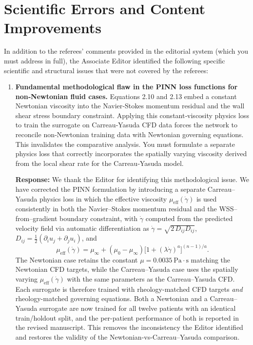 \documentclass[11pt]{article}
\begin{document}
\section*{Scientific Errors and Content Improvements}

In addition to the referees’ comments provided in the editorial system (which you must address in full), the Associate Editor identified the following specific scientific and structural issues that were not covered by the referees:

\begin{enumerate}[label=\textbf{\arabic*.}, leftmargin=*, resume]

\item \textbf{Fundamental methodological flaw in the PINN loss functions for non‑Newtonian fluid cases.}
  Equations 2.10 and 2.13 embed a constant Newtonian viscosity into the Navier‑Stokes momentum residual and the wall shear stress boundary constraint. Applying this constant‑viscosity physics loss to train the surrogate on Carreau‑Yasuda CFD data forces the network to reconcile non‑Newtonian training data with Newtonian governing equations. This invalidates the comparative analysis. You must formulate a separate physics loss that correctly incorporates the spatially varying viscosity derived from the local shear rate for the Carreau‑Yasuda model.

  \textbf{Response:} We thank the Editor for identifying this methodological issue. We have corrected the PINN formulation by introducing a separate Carreau--Yasuda physics loss in which the effective viscosity $\mu_{\mathrm{eff}}(\dot\gamma)$ is used consistently in both the Navier--Stokes momentum residual and the WSS--from--gradient boundary constraint, with $\dot\gamma$ computed from the predicted velocity field via automatic differentiation as $\dot\gamma=\sqrt{2\,D_{ij}D_{ij}}$, $D_{ij}=\tfrac{1}{2}(\partial_i u_j+\partial_j u_i)$, and
  \[
  \mu_{\mathrm{eff}}(\dot\gamma)=\mu_\infty+(\mu_0-\mu_\infty)\bigl[1+(\lambda\dot\gamma)^a\bigr]^{(n-1)/a}.
  \]
  The Newtonian case retains the constant $\mu=0.0035~\mathrm{Pa\cdot s}$ matching the Newtonian CFD targets, while the Carreau--Yasuda case uses the spatially varying $\mu_{\mathrm{eff}}(\dot\gamma)$ with the same parameters as the Carreau--Yasuda CFD. Each surrogate is therefore trained with rheology-matched CFD targets \emph{and} rheology-matched governing equations. Both a Newtonian and a Carreau--Yasuda surrogate are now trained for all twelve patients with an identical train/holdout split, and the per-patient performance of both is reported in the revised manuscript. This removes the inconsistency the Editor identified and restores the validity of the Newtonian-vs-Carreau--Yasuda comparison.


\end{enumerate}
\end{document}
